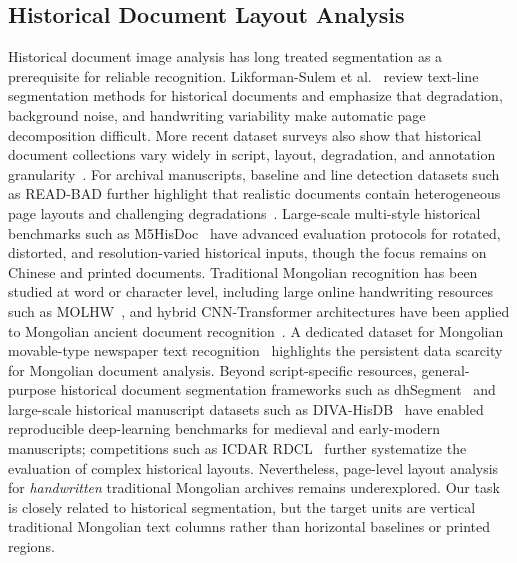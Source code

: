 \documentclass[12pt]{article}
\begin{document}
\subsection{Historical Document Layout Analysis}
Historical document image analysis has long treated segmentation as a prerequisite for reliable recognition. Likforman-Sulem et al.~\cite{likforman2007textline} review text-line segmentation methods for historical documents and emphasize that degradation, background noise, and handwriting variability make automatic page decomposition difficult. More recent dataset surveys also show that historical document collections vary widely in script, layout, degradation, and annotation granularity~\cite{nikolaidou2022survey}. For archival manuscripts, baseline and line detection datasets such as READ-BAD further highlight that realistic documents contain heterogeneous page layouts and challenging degradations~\cite{gruning2017readbad}. Large-scale multi-style historical benchmarks such as M5HisDoc~\cite{shi2023m5hisdoc} have advanced evaluation protocols for rotated, distorted, and resolution-varied historical inputs, though the focus remains on Chinese and printed documents. Traditional Mongolian recognition has been studied at word or character level, including large online handwriting resources such as MOLHW~\cite{pan2023molhw}, and hybrid CNN-Transformer architectures have been applied to Mongolian ancient document recognition~\cite{sun2023mongolian}. A dedicated dataset for Mongolian movable-type newspaper text recognition~\cite{lu2024mongolian} highlights the persistent data scarcity for Mongolian document analysis. Beyond script-specific resources, general-purpose historical document segmentation frameworks such as dhSegment~\cite{oliveira2018dhsegment} and large-scale historical manuscript datasets such as DIVA-HisDB~\cite{simistira2016diva} have enabled reproducible deep-learning benchmarks for medieval and early-modern manuscripts; competitions such as ICDAR RDCL~\cite{clausner2019icdar} further systematize the evaluation of complex historical layouts. Nevertheless, page-level layout analysis for \emph{handwritten} traditional Mongolian archives remains underexplored. Our task is closely related to historical segmentation, but the target units are vertical traditional Mongolian text columns rather than horizontal baselines or printed regions.
\end{document}
